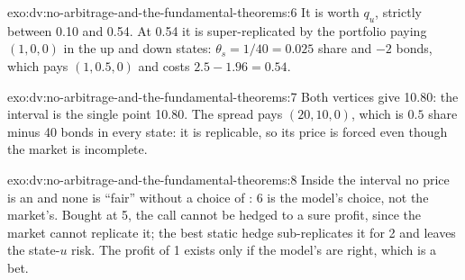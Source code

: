 \begin{solution}{exo:dv:no-arbitrage-and-the-fundamental-theorems:6}
It is worth $q_u$, strictly between 0.10 and 0.54. At 0.54 it is super-replicated
by the portfolio paying $(1,0,0)$ in the up and down states: $\theta_s=1/40=0.025$
share and $-2$ bonds, which pays $(1,0.5,0)$ and costs $2.5-1.96=0.54$.
\end{solution}

\begin{solution}{exo:dv:no-arbitrage-and-the-fundamental-theorems:7}
Both vertices give 10.80: the interval is the single point 10.80. The spread pays
$(20,10,0)$, which is $0.5$ share minus 40 bonds in every state: it is replicable,
so its price is forced even though the market is incomplete.
\end{solution}

\begin{solution}{exo:dv:no-arbitrage-and-the-fundamental-theorems:8}
Inside the interval no price is an  and none is ``fair'' without a
choice of : 6 is the model's choice, not the market's. Bought at 5, the
call cannot be hedged to a sure profit, since the market cannot replicate it; the
best static hedge sub-replicates it for 2 and leaves the state-$u$ risk. The profit
of 1 exists only if the model's  are right, which is a bet.
\end{solution}


